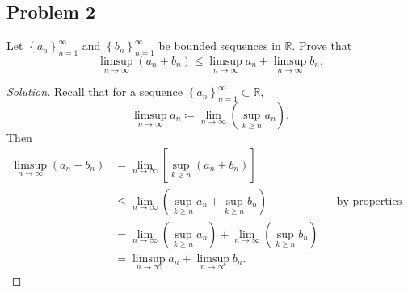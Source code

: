 \documentclass[12pt]{article}
\newcommand{\real}{\mathbb{R}}
\newcommand\paren[1]{\left( #1 \right)}
\newcommand\setb[1]{\left \{ #1 \right \}}
\newcommand{\sqbrack}[1]{\left [ #1 \right ]}
\theoremstyle{definition}
\begin{document}
\subsection{Problem 2}
Let $\setb{ a_n }_{n=1}^{\infty}$ and $\setb{ b_n }_{n=1}^{\infty}$ be bounded sequences in $\real$. Prove that 
\[
    \limsup\limits_{n \to \infty} \paren{ a_n + b_n } \leq \limsup\limits_{n \to \infty} a_n + \limsup\limits_{n \to \infty} b_n .
\]
\begin{proof}[Solution]
    Recall that for a sequence $\setb{ a_n }_{n=1}^{\infty} \subset \real$, 
    \[
        \limsup\limits_{n \to \infty} a_n \coloneqq \lim\limits_{n \to \infty} \paren{ \sup\limits_{k \geq n} a_n }.
    \]
    Then 
    \begin{align*}
        \limsup\limits_{n \to \infty} \paren{ a_n + b_n } & = \lim\limits_{n \to \infty} \sqbrack{ \sup\limits_{k \geq n} \paren{ a_n + b_n } } \\
        & \leq \lim\limits_{n \to \infty} \paren{ \sup\limits_{k \geq n} a_n + \sup\limits_{k \geq n} b_n } && \text{by properties of the supremum} \\
        & = \lim\limits_{n \to \infty} \paren{ \sup\limits_{k \geq n} a_n } + \lim\limits_{n \to \infty} \paren{ \sup\limits_{k \geq n} b_n } \\
        & = \limsup\limits_{n \to \infty} a_n + \limsup\limits_{n \to \infty} b_n.
    \end{align*}
\end{proof}
\end{document}
